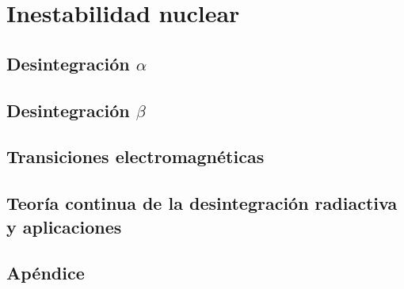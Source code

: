 \chapter{Inestabilidad nuclear}

\section{Desintegración $\alpha$}

\section{Desintegración $\beta$}

\section{Transiciones electromagnéticas}

\section{Teoría continua de la desintegración radiactiva y aplicaciones}

\section{Apéndice}